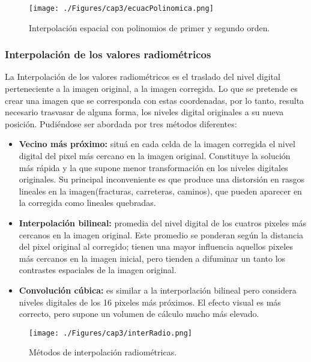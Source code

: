     \begin{figure}[H]
    	\centering
    	\texttt{[image: ./Figures/cap3/ecuacPolinomica.png]}
    	\caption{Interpolaci\'on espacial con polinomios de primer y segundo orden.}
    	\label{fig:intPolEcua}
    \end{figure}


\subsubsection{Interpolaci\'on de los valores radiom\'etricos}
La Interpolaci\'on de los valores radiom\'etricos es el traslado del nivel digital perteneciente a la imagen original, a la imagen corregida. Lo que se pretende es crear una imagen que se corresponda con estas coordenadas, por lo tanto, resulta necesario trasvasar de alguna forma, los niveles digital originales a su nueva posici\'on. Pudi\'endose ser abordada por tres m\'etodos diferentes:
	\begin{itemize}
		\item \textbf{Vecino m\'as pr\'oximo:} situ\'a en cada celda de la imagen corregida el nivel digital del pixel m\'as cercano en la imagen original. Constituye la soluci\'on m\'as r\'apida y la que supone menor transformaci\'on en los niveles digitales originales. Su principal inconveniente es que produce una distorsi\'on en rasgos lineales en la imagen(fracturas, carreteras, caminos), que pueden aparecer en la corregida como lineales quebradas.
		\item \textbf{Interpolaci\'on bilineal:} promedia del nivel digital de los cuatros pixeles m\'as cercanos en la imagen original. Este promedio se ponderan seg\'un la distancia del pixel original al corregido; tienen una mayor influencia aquellos pixeles m\'as cercanos en la imagen inicial, pero tienden a difuminar un tanto los contrastes espaciales de la imagen original.
		\item \textbf{Convoluci\'on c\'ubica:} es similar a la interporlaci\'on bilineal pero considera niveles digitales de los 16 pixeles m\'as pr\'oximos. El efecto visual es m\'as correcto, pero supone un volumen de c\'alculo mucho m\'as elevado.
	\end{itemize}

    \begin{figure}[H]
    	\centering
    	\texttt{[image: ./Figures/cap3/interRadio.png]}
    	\caption{M\'etodos de interpolaci\'on radiom\'etricas.}
    	\label{fig:intRadiometrica}
    \end{figure}



